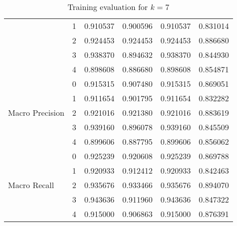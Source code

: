 \documentclass[twocolumn, a4paper, 8pt]{article}
\begin{document}
\begin{table}[h]
\begin{minipage}{0.45\textwidth}
{\begin{tabular}{llrrrr}
					& 1 & 0.910537 & 0.900596 & 0.910537 & 0.831014 \\
					& 2 & 0.924453 & 0.924453 & 0.924453 & 0.886680 \\
					& 3 & 0.938370 & 0.894632 & 0.938370 & 0.844930 \\
					& 4 & 0.898608 & 0.886680 & 0.898608 & 0.854871 \\
					\cline{1-6}
					\toprule
					\multirow[t]{5}{*}{Macro Precision} & 0 & 0.915315 & 0.907480 & 0.915315 & 0.869051 \\
					& 1 & 0.911654 & 0.901795 & 0.911654 & 0.832282 \\
					& 2 & 0.921016 & 0.921380 & 0.921016 & 0.883619 \\
					& 3 & 0.939160 & 0.896078 & 0.939160 & 0.845509 \\
					& 4 & 0.899606 & 0.887795 & 0.899606 & 0.856062 \\
					\cline{1-6}
					\toprule
					\multirow[t]{5}{*}{Macro Recall} & 0 & 0.925239 & 0.920608 & 0.925239 & 0.869788 \\
					& 1 & 0.920933 & 0.912412 & 0.920933 & 0.842463 \\
					& 2 & 0.935676 & 0.933466 & 0.935676 & 0.894070 \\
					& 3 & 0.943636 & 0.911960 & 0.943636 & 0.847322 \\
					& 4 & 0.915000 & 0.906863 & 0.915000 & 0.876391 \\
					\bottomrule
				\end{tabular}
			}
			\caption{Training evaluation for $k = 7$}
			\label{tab:k7table}
		\end{minipage}
		\hfill
		\begin{minipage}{0.45\textwidth}
			\vspace{0.5cm}
			\centering
\end{minipage}
\end{table}
\end{document}
